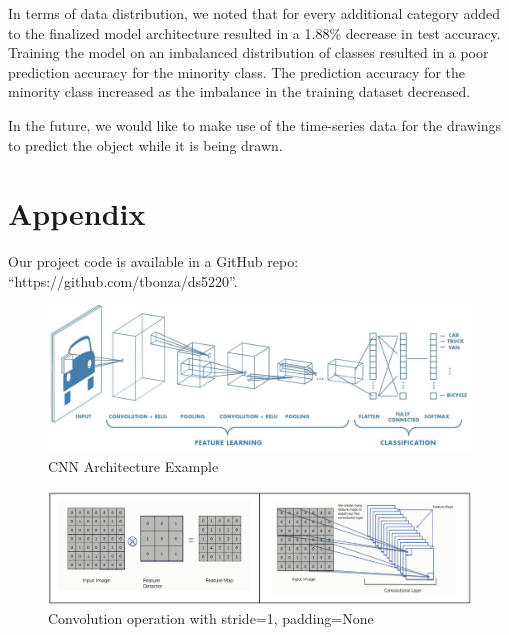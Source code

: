 \documentclass[11pt]{article}
\begin{document}
In terms of data distribution, we noted that for every additional category
added to the finalized model architecture resulted in a 1.88\% decrease in
test accuracy. Training the model on an imbalanced distribution of classes
resulted in a poor prediction accuracy for the minority class. The
prediction accuracy for the minority class increased as the imbalance in
the training dataset decreased.

In the future, we would like to make use of the time-series data for the
drawings to predict the object while it is being drawn.





\section{Appendix}

Our project code is available in a GitHub repo: ``https://github.com/tbonza/ds5220''.


\begin{figure}[h!]
  \begin{center}
    \includegraphics[scale=0.5]{fig5}
    \end{center}
  \caption{CNN Architecture Example}
  \label{fig:CNN}
\end{figure}

\begin{figure}[h!]
  \begin{center}
    \includegraphics[scale=0.5]{fig6}
    \end{center}
  \caption{Convolution operation with stride=1, padding=None}
  \label{fig:CNNStridePad}
\end{figure}
\end{document}
